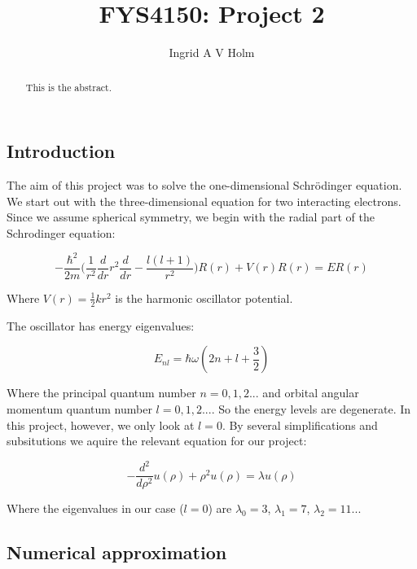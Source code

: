 \documentclass[11pt]{article}
\begin{document}
\title{FYS4150: Project 2}
\author{Ingrid A V Holm}
\maketitle

\begin{abstract}
This is the abstract.
\end{abstract}

\subsection*{Introduction}

\begin{flushleft}
The aim of this project was to solve the one-dimensional Schrödinger equation. We start out with the three-dimensional equation for two interacting electrons. Since we assume spherical symmetry, we begin with the radial part of the Schrodinger equation: 

\begin{equation}
- \frac{\hbar^2}{2 m} \Big(
\frac{1}{r^2} \frac{d}{dr} r^2 \frac{d}{dr} - \frac{l(l+1)}{r^2} \Big) R(r) + V(r)R(r) = ER(r)
\end{equation}

Where $V(r) = \frac{1}{2} kr^2$ is the harmonic oscillator potential. 

\end{flushleft}

\begin{flushleft}
The oscillator has energy eigenvalues:

\begin{equation}
E_{nl} = \hbar \omega (2n + l  + \frac{3}{2})
\end{equation}

Where the principal quantum number $n = 0,1,2...$ and orbital angular momentum quantum number $l=0,1,2...$. So the energy levels are degenerate. In this project, however, we only look at $l=0$. By several simplifications and subsitutions we aquire the relevant equation for our project:

\begin{equation}
-\frac{d^2}{d \rho^2} u(\rho) + \rho^2 u(\rho) = \lambda u(\rho)
\end{equation}

Where the eigenvalues in our case ($l=0$) are $\lambda_0=3$, $\lambda_1=7$, $\lambda_2 = 11$...
\end{flushleft}


\subsection*{Numerical approximation}
\end{document}
